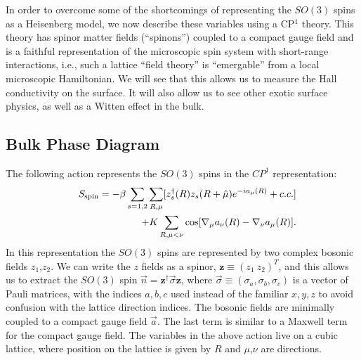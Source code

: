 \documentclass[prb,twocolumn]{revtex4-1}
\begin{document}
In order to overcome some of the shortcomings of representing the $SO(3)$ spins as a Heisenberg model, we now describe these variables using a CP$^1$ theory. 
This theory has spinor matter fields (``spinons'') coupled to a compact gauge field and is a faithful representation of the microscopic spin system with short-range interactions, i.e., such a lattice ``field theory'' is ``emergable'' from a local microscopic Hamiltonian. We will see that this allows us to measure the Hall conductivity on the surface. It will also allow us to see other exotic surface physics, as well as a Witten effect in the bulk.

\subsection{Bulk Phase Diagram}
The following action represents the $SO(3)$ spins in the $CP^1$ representation:
\begin{eqnarray}
&&S_{\rm spin}=-\beta\sum_{s=1,2}\sum_{R,\mu} [z_s^\dagger(R)z_s(R+\hat\mu)e^{-ia_\mu(R)}+c.c.] \nonumber\\
&&+K\sum_{R,\mu<\nu} \cos[\nabla_\mu a_\nu(R)-\nabla_\nu a_\mu(R)].
\label{cp1action}
\end{eqnarray} 
In this representation the $SO(3)$ spins are represented by two complex bosonic fields $z_1$,$z_2$. We can write the $z$ fields as a spinor, $\mathbf{z}\equiv(z_1~z_2)^T$, and this allows us to extract the $SO(3)$ spin $\vec{n}=\mathbf{z^\dagger} \vec\sigma \mathbf{z}$, where $\vec{\sigma}\equiv (\sigma_a,\sigma_b,\sigma_c)$ is a vector of Pauli matrices, with the indices $a,b,c$ used instead of the familiar $x,y,z$ to avoid confusion with the lattice direction indices.
The bosonic fields are minimally coupled to a compact gauge field $\vec{a}$. The last term is similar to a Maxwell term for the compact gauge field. The variables in the above action live on a cubic lattice, where position on the lattice is given by $R$ and $\mu$,$\nu$ are directions.
\end{document}
